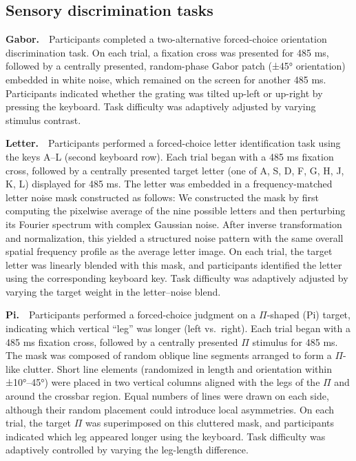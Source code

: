 \documentclass[
  ,man]{apa6}
\begin{document}
\subsection{Sensory discrimination tasks}\label{sensory-discrimination-tasks}

\textbf{Gabor.}\(\quad\)Participants completed a two-alternative forced-choice orientation discrimination task. On each trial, a fixation cross was presented for 485 ms, followed by a centrally presented, random-phase Gabor patch (±45° orientation) embedded in white noise, which remained on the screen for another 485 ms. Participants indicated whether the grating was tilted up-left or up-right by pressing the keyboard. Task difficulty was adaptively adjusted by varying stimulus contrast.

\textbf{Letter.}\(\quad\)Participants performed a forced-choice letter identification task using the keys A--L (second keyboard row). Each trial began with a 485 ms fixation cross, followed by a centrally presented target letter (one of A, S, D, F, G, H, J, K, L) displayed for 485 ms. The letter was embedded in a frequency-matched letter noise mask constructed as follows: We constructed the mask by first computing the pixelwise average of the nine possible letters and then perturbing its Fourier spectrum with complex Gaussian noise. After inverse transformation and normalization, this yielded a structured noise pattern with the same overall spatial frequency profile as the average letter image. On each trial, the target letter was linearly blended with this mask, and participants identified the letter using the corresponding keyboard key. Task difficulty was adaptively adjusted by varying the target weight in the letter--noise blend.

\textbf{Pi.}\(\quad\)Participants performed a forced-choice judgment on a \(\Pi\)-shaped (Pi) target, indicating which vertical ``leg'' was longer (left vs.~right). Each trial began with a 485 ms fixation cross, followed by a centrally presented \(\Pi\) stimulus for 485 ms. The mask was composed of random oblique line segments arranged to form a \(\Pi\)-like clutter. Short line elements (randomized in length and orientation within ±10°--45°) were placed in two vertical columns aligned with the legs of the \(\Pi\) and around the crossbar region. Equal numbers of lines were drawn on each side, although their random placement could introduce local asymmetries. On each trial, the target \(\Pi\) was superimposed on this cluttered mask, and participants indicated which leg appeared longer using the keyboard. Task difficulty was adaptively controlled by varying the leg-length difference.
\end{document}
